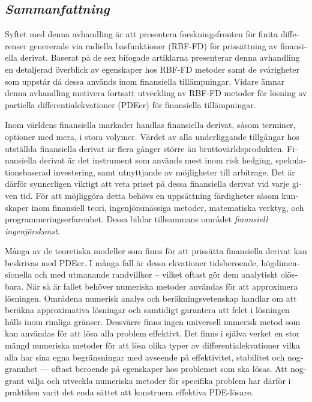 \documentclass{UUThesisTemplate}
\begin{document}
 
 
 
 
 
 
 
 
 
\newpage
\begin{swedish}
\chapter{\emph{Sammanfattning}}
{\noteunic

\par
Syftet med denna avhandling är att presentera forskningsfronten för finita differenser genererade via radiella basfunktioner (RBF-FD) för prissättning av finansiella derivat.
Baserat på de sex bifogade artiklarna presenterar denna avhandling en detaljerad överblick av egenskaper hos RBF-FD metoder samt de svårigheter som uppstår då dessa används inom finansiella tillämpningar.
Vidare ämnar denna avhandling motivera fortsatt utveckling av RBF-FD metoder för lösning av partiella differentialekvationer (PDEer) för finansiella tillämpningar.

\par
Inom världens finansiella markader handlas finansiella derivat, såsom terminer, optioner med mera, i stora volymer.
Värdet av alla underliggande tillgångar hos utställda finansiella derivat är flera gånger större än bruttovärldsprodukten.
Finansiella derivat är det instrument som används mest inom risk hedging, spekulationsbaserad investering, samt utnyttjande av möjligheter till arbitrage.
Det är därför synnerligen viktigt att veta priset på dessa finansiella derivat vid varje given tid.
För att möjliggöra detta behövs en uppsättning färdigheter såsom kunskaper inom finansiell teori, ingenjörsmässiga metoder, matematiska verktyg, och programmeringserfarenhet. Dessa bildar tillsammans området \emph{finansiell ingenjörskonst}.

\par
Många av de teoretiska modeller som finns för att prissätta finansiella derivat kan beskrivas med PDEer.
I många fall är dessa ekvationer tidsberoende, högdimensionella och med utmanande randvillkor -- vilket oftast gör dem analytiskt olösbara.
När så är fallet behöver numeriska metoder användas för att approximera lösningen.
Områdena numerisk analys och beräkningsvetenskap handlar om att beräkna approximativa lösningar och samtidigt garantera att felet i lösningen hålls inom rimliga gränser.
Dessvärre finns ingen universell numerisk metod som kan användas för att lösa alla problem effektivt.
Det finns i själva verket en stor mängd numeriska metoder för att lösa olika typer av differentialekvationer vilka alla har sina egna begränsningar med avseende på effektivitet, stabilitet och noggrannhet --- oftast beroende på egenskaper hos problemet som ska lösas.
Att noggrant välja och utveckla numeriska metoder för specifika problem har därför i praktiken varit det enda sättet att konstruera effektiva PDE-lösare.

}
\end{swedish}
\end{document}
